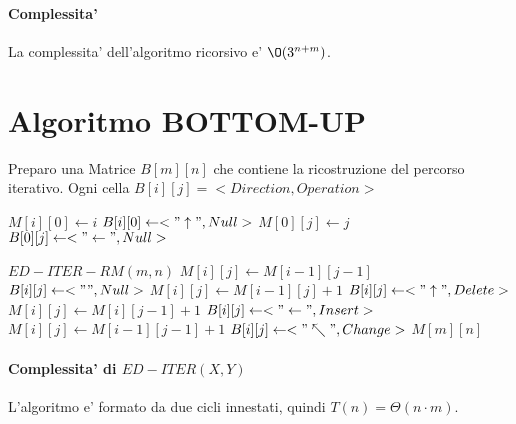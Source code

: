 \paragraph{Complessita'}

La complessita' dell'algoritmo ricorsivo e' $\O(3^{n+m})$.

\newpage

\section{Algoritmo BOTTOM-UP}

Preparo una Matrice $B[m][n]$ che contiene la ricostruzione del percorso iterativo.
Ogni cella $B[i][j] = <Direction, Operation>$

\begin{algorithm}
    \begin{algorithmic}
                \State $M[i][0] \gets i$
                \State $B[i][0] \gets <"\uparrow", Null>$
            \EndFor
                \State $M[0][j] \gets j$
                \State $B[0][j] \gets <"\leftarrow", Null>$
            \EndFor
        \EndProcedure
    \end{algorithmic}
\end{algorithm}

\begin{algorithm}
    \begin{algorithmic}
            \State $ED-ITER-RM(m, n)$
                        \State $M[i][j] \gets M[i-1][j-1]$
                        \State $B[i][j] \gets <"", Null>$
                        \State $M[i][j] \gets M[i-1][j] + 1$
                        \State $B[i][j] \gets <"\uparrow", Delete>$
                        \State $M[i][j] \gets M[i][j-1] + 1$
                        \State $B[i][j] \gets <"\leftarrow", Insert>$
                    \Else
                        \State $M[i][j] \gets M[i-1][j-1] + 1$
                        \State $B[i][j] \gets <"\nwarrow", Change>$
                    \EndIf
                \EndFor
            \EndFor
            \State \Return $M[m][n]$
        \EndProcedure
    \end{algorithmic}
\end{algorithm}

\paragraph{Complessita' di $ED-ITER(X, Y)$}

L'algoritmo e' formato da due cicli innestati, quindi $T(n) = \Theta(n \cdot m)$.